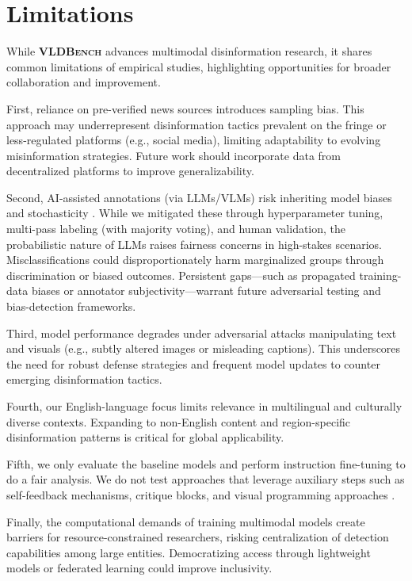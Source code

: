 \section{Limitations}
\label{limits}
While \textsf{\textbf{\textsc{VLDBench}}} advances multimodal disinformation research, it shares common limitations of empirical studies, highlighting opportunities for broader collaboration and improvement.

First, reliance on pre-verified news sources introduces sampling bias. This approach may underrepresent disinformation tactics prevalent on the fringe or less-regulated platforms (e.g., social media), limiting adaptability to evolving misinformation strategies. Future work should incorporate data from decentralized platforms to improve generalizability.

Second, AI-assisted annotations (via LLMs/VLMs) risk inheriting model biases \cite{gilardi2023chatgpt} and stochasticity \cite{bender2021dangers}. While we mitigated these through hyperparameter tuning, multi-pass labeling (with majority voting), and human validation, the probabilistic nature of LLMs raises fairness concerns in high-stakes scenarios. Misclassifications could disproportionately harm marginalized groups through discrimination or biased outcomes. Persistent gaps—such as propagated training-data biases or annotator subjectivity—warrant future adversarial testing and bias-detection frameworks.

Third, model performance degrades under adversarial attacks manipulating text and visuals (e.g., subtly altered images or misleading captions). This underscores the need for robust defense strategies and frequent model updates to counter emerging disinformation tactics.

Fourth, our English-language focus limits relevance in multilingual and culturally diverse contexts. Expanding to non-English content and region-specific disinformation patterns is critical for global applicability.

Fifth, we only evaluate the baseline models and perform instruction fine-tuning to do a fair analysis. We do not test approaches that leverage auxiliary steps such as self-feedback mechanisms, critique blocks, and visual programming approaches \cite{mahmood2024vurf}.

Finally, the computational demands of training multimodal models create barriers for resource-constrained researchers, risking centralization of detection capabilities among large entities. Democratizing access through lightweight models or federated learning could improve inclusivity.

